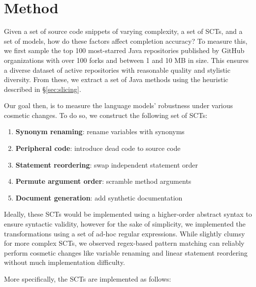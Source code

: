 \documentclass[sigconf,review,anonymous]{acmart}
\begin{document}
  \pagebreak\section{Method}

  Given a set of source code snippets of varying complexity, a set of SCTs, and a set of models, how do these factors affect completion accuracy? To measure this, we first sample the top 100 most-starred Java repositories published by GitHub organizations with over 100 forks and between 1 and 10 MB in size. This ensures a diverse dataset of active repositories with reasonable quality and stylistic diversity. From these, we extract a set of Java methods using the heuristic described in \S\ref{sec:slicing}.

  Our goal then, is to measure the language models' robustness under various cosmetic changes. To do so, we construct the following set of SCTs:

  \begin{enumerate}
    \item \textbf{Synonym renaming}: rename variables with synonyms
    \item \textbf{Peripheral code}: introduce dead code to source code
    \item \textbf{Statement reordering}: swap independent statement order
    \item \textbf{Permute argument order}: scramble method arguments
    \item \textbf{Document generation}: add synthetic documentation
  \end{enumerate}

  Ideally, these SCTs would be implemented using a higher-order abstract syntax to ensure syntactic validity, however for the sake of simplicity, we implemented the transformations using a set of ad-hoc regular expressions. While slightly clumsy for more complex SCTs, we observed regex-based pattern matching can reliably perform cosmetic changes like variable renaming and linear statement reordering without much implementation difficulty.

  More specifically, the SCTs are implemented as follows:
\end{document}
